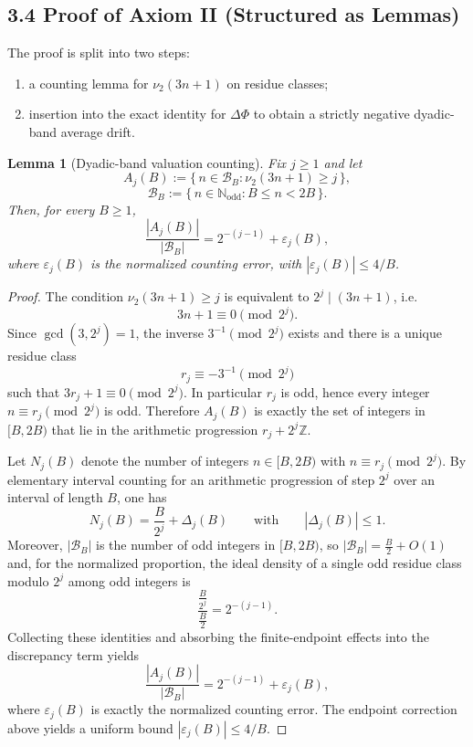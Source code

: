 \documentclass[preprint,12pt]{elsarticle}
\newtheorem{lemma}{Lemma}
\begin{document}
\subsection{3.4 Proof of Axiom II (Structured as Lemmas)}
The proof is split into two steps:
\begin{enumerate}
\item a counting lemma for \(\nu_2(3n+1)\) on residue classes;
\item insertion into the exact identity for \(\Delta\Phi\) to obtain a strictly negative dyadic-band average drift.
\end{enumerate}


\begin{lemma}[Dyadic-band valuation counting]\label{lem:dyadic_band_valuation_counting}
Fix $j\ge 1$ and let
\[
A_j(B):=\{\,n\in \mathcal{B}_B:\nu_2(3n+1)\ge j\,\},
\]
\[
\mathcal{B}_B:=\{\,n\in\mathbb{N}_{\mathrm{odd}}: B\le n<2B\,\}.
\]
Then, for every $B\ge 1$,
\[
\frac{|A_j(B)|}{|\mathcal{B}_B|}=2^{-(j-1)}+\varepsilon_j(B),
\]
where $\varepsilon_j(B)$ is the normalized counting error, with $|\varepsilon_j(B)|\le 4/B$.
\end{lemma}

\begin{proof}
The condition $\nu_2(3n+1)\ge j$ is equivalent to $2^j\mid (3n+1)$, i.e.
\[
3n+1\equiv 0\pmod{2^j}.
\]
Since $\gcd(3,2^j)=1$, the inverse $3^{-1}\pmod{2^j}$ exists and there is a unique residue class
\[
r_j \equiv -3^{-1}\pmod{2^j}
\]
such that $3r_j+1\equiv 0\pmod{2^j}$. In particular $r_j$ is odd, hence every integer $n\equiv r_j\pmod{2^j}$
is odd. Therefore $A_j(B)$ is exactly the set of integers in $[B,2B)$ that lie in
the arithmetic progression $r_j+2^j\mathbb{Z}$.

Let $N_j(B)$ denote the number of integers $n\in[B,2B)$ with $n\equiv r_j\pmod{2^j}$. By elementary interval
counting for an arithmetic progression of step $2^j$ over an interval of length $B$, one has
\[
N_j(B)=\frac{B}{2^j}+\Delta_j(B)
\qquad\text{with}\qquad
|\Delta_j(B)|\le 1.
\]
Moreover, $|\mathcal{B}_B|$ is the number of odd integers in $[B,2B)$, so $|\mathcal{B}_B|=\frac{B}{2}+O(1)$ and, for the
normalized proportion, the ideal density of a single odd residue class modulo $2^j$ among odd integers is
\[
\frac{\frac{B}{2^j}}{\frac{B}{2}}=2^{-(j-1)}.
\]
Collecting these identities and absorbing the finite-endpoint effects into the discrepancy term yields
\[
\frac{|A_j(B)|}{|\mathcal{B}_B|}=2^{-(j-1)}+\varepsilon_j(B),
\]
where $\varepsilon_j(B)$ is exactly the normalized counting error. The endpoint correction above yields a
uniform bound $|\varepsilon_j(B)|\le 4/B$.
\end{proof}
\end{document}
